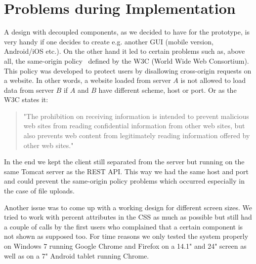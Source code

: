 \section{Problems during Implementation}

A design with decoupled components, as we decided to have for the prototype, is very handy if one decides to create e.g. another GUI (mobile version, Android/iOS etc.). On the other hand it led to certain problems such as, above all, the same-origin policy~\cite{sameOrigin} defined by the W3C (World Wide Web Consortium). This policy was developed to protect users by disallowing cross-origin requests on a website. In other words, a website loaded from server $A$ is not allowed to load data from server $B$ if $A$ and $B$ have different scheme, host or port. Or as the W3C states it: 
\begin{quote}
"The prohibition on receiving information is intended to prevent malicious web sites from reading confidential information from other web sites, 
but also prevents web content from legitimately reading information offered by other web sites."
\end{quote}
In the end we kept the client still separated from the server but running on the same Tomcat server as the REST API. This way we had the same host and port and could prevent the same-origin policy problems which occurred especially in the case of file uploads. 

Another issue was to come up with a working design for different screen sizes. We tried to work with percent attributes in the CSS as much as possible but still had a couple of calls by the first users who complained that a certain component is not shown as supposed too. For time reasons we only tested the system properly on Windows 7 running Google Chrome and Firefox on a 14.1" and 24" screen as well as on a 7" Android tablet running Chrome. 


